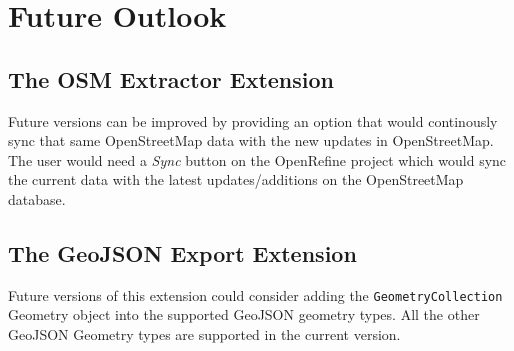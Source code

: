 \section*{Future Outlook}
\subsection*{The OSM Extractor Extension}
Future versions can be improved by providing an option that would continously sync that same OpenStreetMap data
with the new updates in OpenStreetMap. The user would need a \textit{Sync} button on the OpenRefine project which would
sync the current data with the latest updates/additions on the OpenStreetMap database.
\subsection*{The GeoJSON Export Extension}
Future versions of this extension could consider adding the  \texttt{GeometryCollection} Geometry object
into the supported GeoJSON geometry types. All the other GeoJSON Geometry types are supported in the current version.